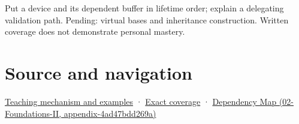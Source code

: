 Put a device and its dependent buffer in lifetime order; explain a delegating validation path. Pending: virtual bases and inheritance construction. Written coverage does not demonstrate personal mastery.

\section{Source and navigation}\label{appendix-3cb49709605a-source-and-navigation}

\href{Continuous\%20Notes/Computing\%20Foundations\%20-\%20From\%20Bits\%20to\%20C++\%20and\%20Systems\%20APIs\#Construction\%20order\%20records\%20lifetime\%20dependencies}{Teaching mechanism and examples} · \hyperref[appendix-fd090d982a15-m009---parts-127-147]{Exact coverage} · \href{../02-Foundations-II/main.pdf\#nameddest=appendix-4ad47bdd269a}{Dependency Map (02-Foundations-II, appendix-4ad47bdd269a)}
